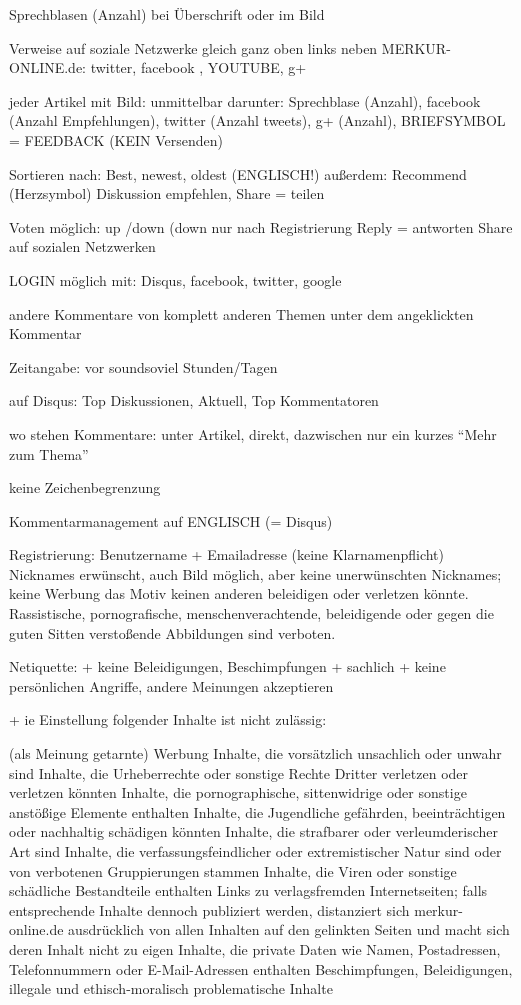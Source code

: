 Sprechblasen (Anzahl) bei Überschrift oder im Bild

Verweise auf soziale Netzwerke  gleich ganz oben links neben MERKUR-ONLINE.de: twitter, facebook , YOUTUBE, g+

jeder Artikel mit Bild: unmittelbar darunter: Sprechblase (Anzahl), facebook (Anzahl Empfehlungen), twitter (Anzahl tweets), g+ (Anzahl), BRIEFSYMBOL = FEEDBACK (KEIN Versenden)

Sortieren nach: Best, newest, oldest (ENGLISCH!)
außerdem: Recommend (Herzsymbol) Diskussion empfehlen, Share = teilen 

Voten möglich: up /down (down nur nach Registrierung
Reply = antworten
Share auf sozialen Netzwerken

LOGIN möglich mit: Disqus, facebook, twitter, google

andere Kommentare von komplett anderen Themen unter dem angeklickten Kommentar

Zeitangabe: vor soundsoviel Stunden/Tagen

auf Disqus: Top Diskussionen, Aktuell, Top Kommentatoren

wo stehen Kommentare: unter Artikel, direkt, dazwischen nur ein kurzes ``Mehr zum Thema''

keine Zeichenbegrenzung

Kommentarmanagement auf ENGLISCH (= Disqus)

Registrierung:
Benutzername + Emailadresse (keine Klarnamenpflicht) Nicknames erwünscht, auch Bild möglich, aber keine unerwünschten Nicknames; keine Werbung
das Motiv keinen anderen beleidigen oder verletzen könnte. Rassistische, pornografische, menschenverachtende, beleidigende oder gegen die guten Sitten verstoßende Abbildungen sind verboten.



Netiquette:
+ keine Beleidigungen, Beschimpfungen
+ sachlich
+ keine persönlichen Angriffe, andere Meinungen akzeptieren 

+ ie Einstellung folgender Inhalte ist nicht zulässig:

    (als Meinung getarnte) Werbung
    Inhalte, die vorsätzlich unsachlich oder unwahr sind
    Inhalte, die Urheberrechte oder sonstige Rechte Dritter verletzen oder verletzen könnten
    Inhalte, die pornographische, sittenwidrige oder sonstige anstößige Elemente enthalten Inhalte, die Jugendliche gefährden, beeinträchtigen oder nachhaltig schädigen könnten
    Inhalte, die strafbarer oder verleumderischer Art sind
    Inhalte, die verfassungsfeindlicher oder extremistischer Natur sind oder von verbotenen Gruppierungen stammen
    Inhalte, die Viren oder sonstige schädliche Bestandteile enthalten
    Links zu verlagsfremden Internetseiten; falls entsprechende Inhalte dennoch publiziert werden, distanziert sich merkur-online.de ausdrücklich von allen Inhalten auf den gelinkten Seiten und macht sich deren Inhalt nicht zu eigen
    Inhalte, die private Daten wie Namen, Postadressen, Telefonnummern oder E-Mail-Adressen enthalten
    Beschimpfungen, Beleidigungen, illegale und ethisch-moralisch problematische Inhalte
    
